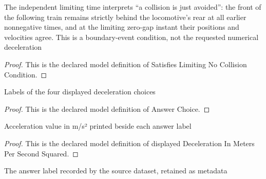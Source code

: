 \begin{definition}
  \label{def:physics:phyx-mini-0730:phyxminiproblems-problemphyxmini0730-satisfieslimitingnocollisioncondition}
  The independent limiting time interprets “a collision is just avoided”: the front of the following train remains strictly behind the locomotive's rear at all earlier nonnegative times, and at the limiting zero-gap instant their positions and velocities agree. This is a boundary-event condition, not the requested numerical deceleration
\end{definition}
\begin{proof}
  This is the declared model definition of Satisfies Limiting No Collision Condition.
\end{proof}
\begin{definition}
  \label{def:physics:phyx-mini-0730:phyxminiproblems-problemphyxmini0730-answerchoice}
  Labels of the four displayed deceleration choices
\end{definition}
\begin{proof}
  This is the declared model definition of Answer Choice.
\end{proof}
\begin{definition}
  \label{def:physics:phyx-mini-0730:phyxminiproblems-problemphyxmini0730-displayeddecelerationinmeterspersecondsquared}
  Acceleration value in m/s² printed beside each answer label
\end{definition}
\begin{proof}
  This is the declared model definition of displayed Deceleration In Meters Per Second Squared.
\end{proof}
\begin{definition}
  \label{def:physics:phyx-mini-0730:phyxminiproblems-problemphyxmini0730-recordeddatasetanswer}
  The answer label recorded by the source dataset, retained as metadata
\end{definition}
